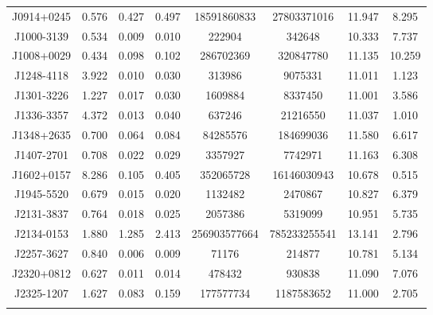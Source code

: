 \begin{table}
\begin{tabular}{cccccccc}
    \addlinespace
      J0914+0245 & 0.576 & 0.427 & 0.497  & 18591860833 & 27803371016  & 11.947 & 8.295  \\
    \addlinespace
      J1000-3139 & 0.534 & 0.009 & 0.010  & 222904 & 342648  & 10.333 & 7.737 \\
    \addlinespace 
      J1008+0029 & 0.434 & 0.098 & 0.102  & 286702369 & 320847780  & 11.135 & 10.259 \\
    \addlinespace
      J1248-4118 & 3.922 & 0.010 & 0.030  & 313986 & 9075331  & 11.011 & 1.123  \\
    \addlinespace
      J1301-3226 & 1.227 & 0.017 & 0.030  & 1609884 & 8337450  & 11.001 & 3.586 \\
    \addlinespace 
      J1336-3357 & 4.372 & 0.013 & 0.040  & 637246 & 21216550  & 11.037 & 1.010  \\
    \addlinespace
      J1348+2635 & 0.700 & 0.064 & 0.084  & 84285576 & 184699036  & 11.580 & 6.617  \\
    \addlinespace
      J1407-2701 & 0.708 & 0.022 & 0.029  & 3357927 & 7742971  & 11.163 & 6.308 \\
    \addlinespace
      J1602+0157 & 8.286 & 0.105 & 0.405  & 352065728 & 16146030943  & 10.678 & 0.515  \\
    \addlinespace
     J1945-5520 & 0.679 & 0.015 & 0.020  & 1132482 & 2470867  & 10.827 & 6.379  \\
    \addlinespace
      J2131-3837 & 0.764 & 0.018 & 0.025  & 2057386 & 5319099  & 10.951 & 5.735  \\
    \addlinespace
      J2134-0153 & 1.880 & 1.285 & 2.413  & 256903577664 & 785233255541  & 13.141 & 2.796 \\
    \addlinespace
     J2257-3627 & 0.840 & 0.006 & 0.009  & 71176 & 214877  & 10.781 & 5.134  \\
    \addlinespace
     J2320+0812 & 0.627 & 0.011 & 0.014  & 478432 & 930838  & 11.090 & 7.076  \\
    \addlinespace
     J2325-1207 & 1.627 & 0.083 & 0.159  & 177577734 & 1187583652  & 11.000 & 2.705 
 \\
    \addlinespace

\end{tabular}
\end{table}
